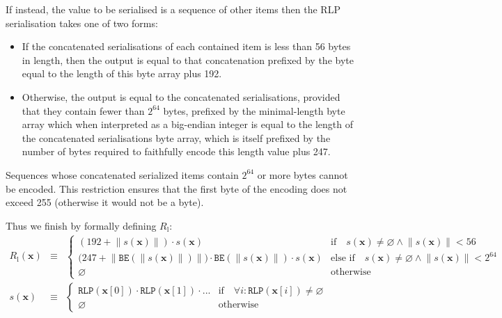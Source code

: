 \documentclass[9pt,oneside]{amsart}
\makeatletter
\newcommand{\linkdest}[1]{\Hy@raisedlink{\hypertarget{#1}{}}}
\makeatother
\begin{document}
\hypertarget{RLP_serialisation_of_a_sequence_of_other_items_R__l_word_def}{}\linkdest{R__l}If instead, the value to be serialised is a sequence of other items then the RLP serialisation takes one of two forms:

\begin{itemize}
\item If the concatenated serialisations of each contained item is less than 56 bytes in length, then the output is equal to that concatenation prefixed by the byte equal to the length of this byte array plus 192.
\item Otherwise, the output is equal to the concatenated serialisations, provided that they contain fewer than $2^{64}$ bytes, prefixed by the minimal-length byte array which when interpreted as a big-endian integer is equal to the length of the concatenated serialisations byte array, which is itself prefixed by the number of bytes required to faithfully encode this length value plus 247.
\end{itemize}

Sequences whose concatenated serialized items contain $2^{64}$ or more bytes cannot be encoded. This restriction ensures that the first byte of the encoding does not exceed 255 (otherwise it would not be a byte).

\hypertarget{RLP_serialisation_of_a_sequence_of_other_items_R__l_math_def}{}Thus we finish by formally defining $R_{\mathrm{l}}$:
\begin{eqnarray}
R_{\mathrm{l}}(\mathbf{x}) & \equiv & \begin{cases}
(192 + \lVert s(\mathbf{x}) \rVert) \cdot s(\mathbf{x}) & \text{if} \quad s(\mathbf{x}) \neq \varnothing \wedge \lVert s(\mathbf{x}) \rVert < 56 \\
\big(247 + \big\lVert \mathtt{BE}(\lVert s(\mathbf{x}) \rVert) \big\rVert \big) \cdot \mathtt{BE}(\lVert s(\mathbf{x}) \rVert) \cdot s(\mathbf{x}) & \text{else if} \quad s(\mathbf{x}) \neq \varnothing \wedge \lVert s(\mathbf{x}) \rVert < 2^{64} \\
\varnothing & \text{otherwise}
\end{cases} \\
s(\mathbf{x}) & \equiv & \begin{cases}
\mathtt{RLP}(\mathbf{x}[0]) \cdot \mathtt{RLP}(\mathbf{x}[1]) \cdot ... & \text{if} \quad \forall i: \mathtt{RLP}(\mathbf{x}[i]) \neq \varnothing \\
\varnothing & \text{otherwise}
\end{cases}
\end{eqnarray}
\end{document}
